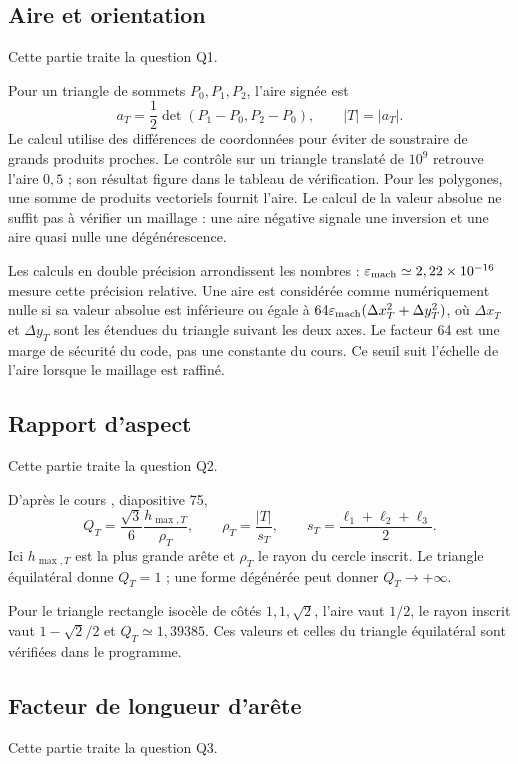 \documentclass[12pt,a4paper]{article}
\begin{document}
\subsection{Aire et orientation}
Cette partie traite la question Q1.

Pour un triangle de sommets $P_0,P_1,P_2$, l'aire signée est
\begin{equation*}
a_T=\frac12\det(P_1-P_0,P_2-P_0),\qquad |T|=|a_T|.
\end{equation*}
Le calcul utilise des différences de coordonnées pour éviter de soustraire de grands produits proches. Le contrôle sur un triangle translaté de $10^9$ retrouve l'aire $0,5$ ; son résultat figure dans le tableau de vérification. Pour les polygones, une somme de produits vectoriels fournit l'aire. Le calcul de la valeur absolue ne suffit pas à vérifier un maillage : une aire négative signale une inversion et une aire quasi nulle une dégénérescence.

Les calculs en double précision arrondissent les nombres : $\varepsilon_{\rm mach}\simeq2,22\times10^{-16}$ mesure cette précision relative. Une aire est considérée comme numériquement nulle si sa valeur absolue est inférieure ou égale à $64\varepsilon_{\rm mach}(\Delta x_T^2+\Delta y_T^2)$, où $\Delta x_T$ et $\Delta y_T$ sont les étendues du triangle suivant les deux axes. Le facteur 64 est une marge de sécurité du code, pas une constante du cours. Ce seuil suit l'échelle de l'aire lorsque le maillage est raffiné.

\subsection{Rapport d'aspect}
Cette partie traite la question Q2.

D’après le cours \cite{mesh}, diapositive 75,
\begin{equation*}
Q_T=\frac{\sqrt3}{6}\frac{h_{\max,T}}{\rho_T},\qquad
\rho_T=\frac{|T|}{s_T},\qquad s_T=\frac{\ell_1+\ell_2+\ell_3}{2}.
\end{equation*}
Ici $h_{\max,T}$ est la plus grande arête et $\rho_T$ le rayon du cercle inscrit. Le triangle équilatéral donne $Q_T=1$ ; une forme dégénérée peut donner $Q_T\to+\infty$.

Pour le triangle rectangle isocèle de côtés $1,1,\sqrt2$, l'aire vaut $1/2$, le rayon inscrit vaut $1-\sqrt2/2$ et $Q_T\simeq1,39385$. Ces valeurs et celles du triangle équilatéral sont vérifiées dans le programme.

\subsection{Facteur de longueur d'arête}
Cette partie traite la question Q3.
\end{document}
